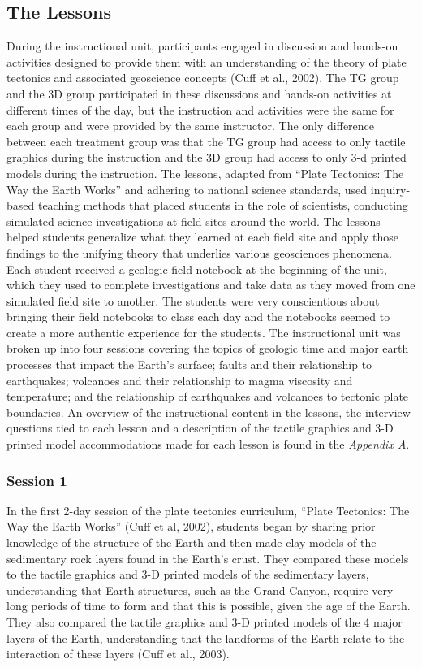 \documentclass[11.5pt]{sig-alternate} %
\begin{document}
\begin{large}
\subsection*{The Lessons}
 
During the instructional unit, participants engaged in discussion and hands-on activities designed to provide them with an understanding of the theory of plate tectonics and associated geoscience concepts (Cuff et al., 2002).  The TG group and the 3D group participated in these discussions and hands-on activities at different times of the day, but the instruction and activities were the same for each group and were provided by the same instructor.  The only difference between each treatment group was that the TG group had access to only tactile graphics during the instruction and the 3D group had access to only 3-d printed models during the instruction.   The lessons, adapted from “Plate Tectonics: The Way the Earth Works” and adhering to national science standards, used inquiry-based teaching methods that placed students in the role of scientists, conducting simulated science investigations at field sites around the world.  The lessons helped students generalize what they learned at each field site and apply those findings to the unifying theory that underlies various geosciences phenomena.  Each student received a geologic field notebook at the beginning of the unit, which they used to complete investigations and take data as they moved from one simulated field site to another. The students were very conscientious about bringing their field notebooks to class each day and the notebooks seemed to create a more authentic experience for the students. The instructional unit was broken up into four sessions covering the topics of geologic time and major earth processes that impact the Earth’s surface; faults and their relationship to earthquakes; volcanoes and their relationship to magma viscosity and temperature; and the relationship of earthquakes and volcanoes to tectonic plate boundaries.  An overview of the instructional content in the lessons, the interview questions tied to each lesson and a description of the tactile graphics and 3-D printed model accommodations made for each lesson is found in the \textit{Appendix A}.

\subsubsection*{Session 1}

In the first 2-day session of the plate tectonics curriculum, “Plate Tectonics: The Way the Earth Works” (Cuff et al, 2002), students began by sharing prior knowledge of the structure of the Earth and then made clay models of the sedimentary rock layers found in the Earth’s crust.  They compared these models to the tactile graphics and 3-D printed models of the sedimentary layers, understanding that Earth structures, such as the Grand Canyon, require very long periods of time to form and that this is possible, given the age of the Earth.  They also compared the tactile graphics and 3-D printed models of the 4 major layers of the Earth, understanding that the landforms of the Earth relate to the interaction of these layers (Cuff et al., 2003).


\end{large}
\end{document}
